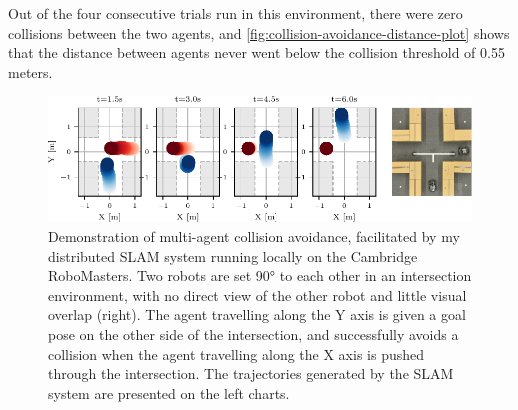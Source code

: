 Out of the four consecutive trials run in this environment, there were zero collisions between the two agents, and \autoref{fig:collision-avoidance-distance-plot} shows that the distance between agents never went below the collision threshold of 0.55 meters.


\begin{figure}[h]
    \centering
    \includegraphics[width=\linewidth]{figures/mar25_1_tracer_graph.pdf}

    \caption{Demonstration of multi-agent collision avoidance, facilitated by my distributed SLAM system running locally on the Cambridge RoboMasters. Two robots are set 90° to each other in an intersection environment, with no direct view of the other robot and little visual overlap (right). The agent travelling along the Y axis is given a goal pose on the other side of the intersection, and successfully avoids a collision when the agent travelling along the X axis is pushed through the intersection. The trajectories generated by the SLAM system are presented on the left charts.}
    \label{fig:collision-avoidance}
\end{figure}

